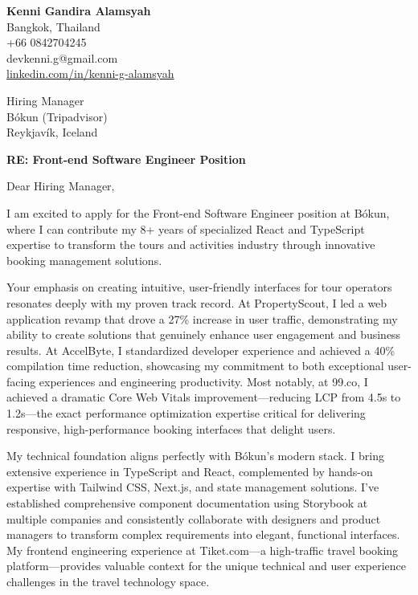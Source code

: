 \documentclass[11pt]{article}
\begin{document}
\begin{flushleft}
\textbf{Kenni Gandira Alamsyah}\\
Bangkok, Thailand\\
+66 0842704245\\
devkenni.g@gmail.com\\
\href{https://www.linkedin.com/in/kenni-g-alamsyah/}{linkedin.com/in/kenni-g-alamsyah}
\end{flushleft}

\vspace{1em}

\begin{flushleft}
Hiring Manager\\
Bókun (Tripadvisor)\\
Reykjavík, Iceland
\end{flushleft}

\vspace{1em}

\textbf{RE: Front-end Software Engineer Position}

\vspace{1em}

Dear Hiring Manager,

I am excited to apply for the Front-end Software Engineer position at Bókun, where I can contribute my 8+ years of specialized React and TypeScript expertise to transform the tours and activities industry through innovative booking management solutions.

Your emphasis on creating intuitive, user-friendly interfaces for tour operators resonates deeply with my proven track record. At PropertyScout, I led a web application revamp that drove a 27\% increase in user traffic, demonstrating my ability to create solutions that genuinely enhance user engagement and business results. At AccelByte, I standardized developer experience and achieved a 40\% compilation time reduction, showcasing my commitment to both exceptional user-facing experiences and engineering productivity. Most notably, at 99.co, I achieved a dramatic Core Web Vitals improvement—reducing LCP from 4.5s to 1.2s—the exact performance optimization expertise critical for delivering responsive, high-performance booking interfaces that delight users.

My technical foundation aligns perfectly with Bókun's modern stack. I bring extensive experience in TypeScript and React, complemented by hands-on expertise with Tailwind CSS, Next.js, and state management solutions. I've established comprehensive component documentation using Storybook at multiple companies and consistently collaborate with designers and product managers to transform complex requirements into elegant, functional interfaces. My frontend engineering experience at Tiket.com—a high-traffic travel booking platform—provides valuable context for the unique technical and user experience challenges in the travel technology space.
\end{document}
